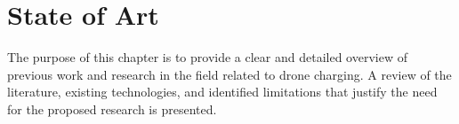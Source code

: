 
\section{State of Art}

The purpose of this chapter is to provide a clear and detailed overview of previous work and research in the field related to drone charging. A review of the literature, existing technologies, and identified limitations that justify the need for the proposed research is presented.








    




